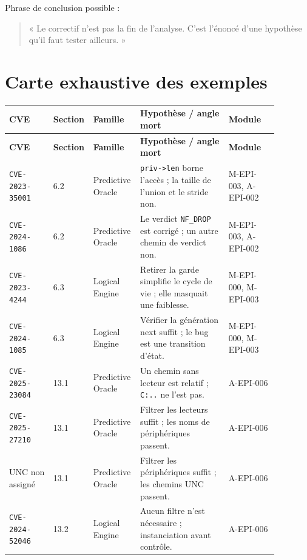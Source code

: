 \documentclass{training}
\begin{document}
Phrase de conclusion possible :

\begin{quote}
« Le correctif n'est pas la fin de l'analyse. C'est l'énoncé d'une hypothèse
qu'il faut tester ailleurs. »
\end{quote}

\chapter{Carte exhaustive des exemples}

\begin{center}
\small
\renewcommand{\arraystretch}{0.95}
\begin{longtable}{|p{0.16\linewidth}|p{0.06\linewidth}|p{0.16\linewidth}|p{0.32\linewidth}|p{0.18\linewidth}|}
\hline
\textbf{CVE} & \textbf{Section} & \textbf{Famille} & \textbf{Hypothèse / angle mort} & \textbf{Module} \\ \hline
\endfirsthead
\hline
\textbf{CVE} & \textbf{Section} & \textbf{Famille} & \textbf{Hypothèse / angle mort} & \textbf{Module} \\ \hline
\endhead
\texttt{CVE-2023-35001} & 6.2 & Predictive Oracle & \texttt{priv->len} borne
l'accès ; la taille de l'union et le stride non. & M-EPI-003, A-EPI-002 \\ \hline
\texttt{CVE-2024-1086} & 6.2 & Predictive Oracle & Le verdict \texttt{NF\_DROP}
est corrigé ; un autre chemin de verdict non. & M-EPI-003, A-EPI-002 \\ \hline
\texttt{CVE-2023-4244} & 6.3 & Logical Engine & Retirer la garde simplifie le
cycle de vie ; elle masquait une faiblesse. & M-EPI-000, M-EPI-003 \\ \hline
\texttt{CVE-2024-1085} & 6.3 & Logical Engine & Vérifier la génération next
suffit ; le bug est une transition d'état. & M-EPI-000, M-EPI-003 \\ \hline
\texttt{CVE-2025-23084} & 13.1 & Predictive Oracle & Un chemin sans lecteur est
relatif ; \texttt{C:..} ne l'est pas. & A-EPI-006 \\ \hline
\texttt{CVE-2025-27210} & 13.1 & Predictive Oracle & Filtrer les lecteurs
suffit ; les noms de périphériques passent. & A-EPI-006 \\ \hline
UNC non assigné & 13.1 & Predictive Oracle & Filtrer les périphériques suffit ;
les chemins UNC passent. & A-EPI-006 \\ \hline
\texttt{CVE-2024-52046} & 13.2 & Logical Engine & Aucun filtre n'est nécessaire ;
instanciation avant contrôle. & A-EPI-006 \\ \hline

\end{longtable}
\end{center}
\end{document}
